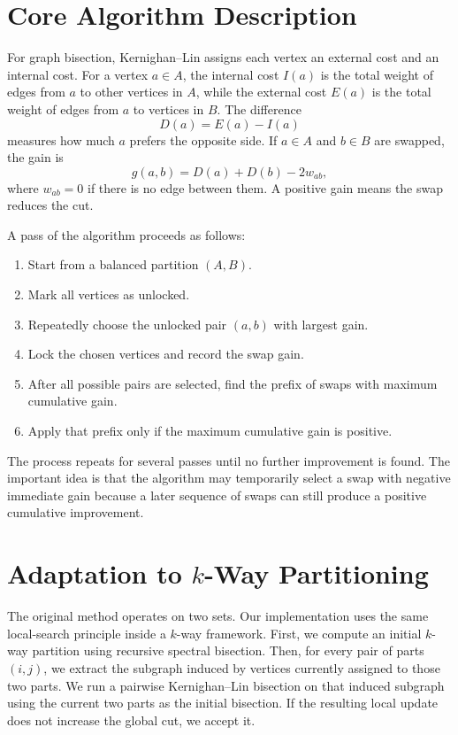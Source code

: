\documentclass[11pt]{article}
\begin{document}
\section{Core Algorithm Description}

For graph bisection, Kernighan--Lin assigns each vertex an external cost and
an internal cost. For a vertex $a\in A$, the internal cost $I(a)$ is the total
weight of edges from $a$ to other vertices in $A$, while the external cost
$E(a)$ is the total weight of edges from $a$ to vertices in $B$. The difference
\[
    D(a) = E(a) - I(a)
\]
measures how much $a$ prefers the opposite side. If $a\in A$ and $b\in B$ are
swapped, the gain is
\[
    g(a,b) = D(a) + D(b) - 2w_{ab},
\]
where $w_{ab}=0$ if there is no edge between them. A positive gain means the
swap reduces the cut.

A pass of the algorithm proceeds as follows:
\begin{enumerate}
    \item Start from a balanced partition $(A,B)$.
    \item Mark all vertices as unlocked.
    \item Repeatedly choose the unlocked pair $(a,b)$ with largest gain.
    \item Lock the chosen vertices and record the swap gain.
    \item After all possible pairs are selected, find the prefix of swaps with
    maximum cumulative gain.
    \item Apply that prefix only if the maximum cumulative gain is positive.
\end{enumerate}

The process repeats for several passes until no further improvement is found.
The important idea is that the algorithm may temporarily select a swap with
negative immediate gain because a later sequence of swaps can still produce a
positive cumulative improvement.

\section{Adaptation to $k$-Way Partitioning}

The original method operates on two sets. Our implementation uses the same
local-search principle inside a $k$-way framework. First, we compute an initial
$k$-way partition using recursive spectral bisection. Then, for every pair of
parts $(i,j)$, we extract the subgraph induced by vertices currently assigned
to those two parts. We run a pairwise Kernighan--Lin bisection on that induced
subgraph using the current two parts as the initial bisection. If the resulting
local update does not increase the global cut, we accept it.
\end{document}
